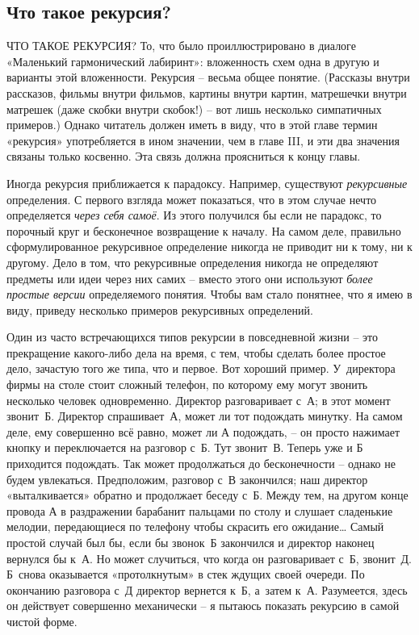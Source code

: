 \documentclass[../main.tex]{subfiles}
\begin{document}

\subsection{Что такое рекурсия?}

ЧТО ТАКОЕ РЕКУРСИЯ? То, что было проиллюстрировано в диалоге «Маленький гармонический лабиринт»: вложенность схем одна в другую и варианты этой вложенности. Рекурсия \--- весьма общее понятие. (Рассказы внутри рассказов, фильмы внутри фильмов, картины внутри картин, матрешечки внутри матрешек (даже скобки внутри скобок!) \--- вот лишь несколько симпатичных примеров.) Однако читатель должен иметь в виду, что в этой главе термин «рекурсия» употребляется в ином значении, чем в главе III, и эти два значения связаны только косвенно. Эта связь должна проясниться к концу главы.

Иногда рекурсия приближается к парадоксу. Например, существуют \emph{рекурсивные} определения. С первого взгляда может показаться, что в этом случае нечто определяется \emph{через себя самоё}. Из этого получился бы если не парадокс, то порочный круг и бесконечное возвращение к началу. На самом деле, правильно сформулированное рекурсивное определение никогда не приводит ни к тому, ни к другому. Дело в том, что рекурсивные определения никогда не определяют предметы или идеи через них самих \--- вместо этого они используют \emph{более простые версии} определяемого понятия. Чтобы вам стало понятнее, что я имею в виду, приведу несколько примеров рекурсивных определений.

Один из часто встречающихся типов рекурсии в повседневной жизни \--- это прекращение какого-либо дела на время, с тем, чтобы сделать более простое дело, зачастую того же типа, что и первое. Вот хороший пример. У~директора фирмы на столе стоит сложный телефон, по которому ему могут звонить несколько человек одновременно. Директор разговаривает с~А; в этот момент звонит~Б\@. Директор спрашивает~А, может ли тот подождать минутку. На самом деле, ему совершенно всё равно, может ли А подождать, \--- он просто нажимает кнопку и переключается на разговор с~Б\@. Тут звонит~В\@. Теперь уже и Б приходится подождать. Так может продолжаться до бесконечности \--- однако не будем увлекаться. Предположим, разговор с~В закончился; наш директор «выталкивается» обратно и продолжает беседу с~Б\@. Между тем, на другом конце провода А в раздражении барабанит пальцами по столу и слушает сладенькие мелодии, передающиеся по телефону чтобы скрасить его ожидание\ldots{} Самый простой случай был бы, если бы звонок~Б закончился и директор наконец вернулся бы к~А\@. Но может случиться, что когда он разговаривает с~Б, звонит~Д\@. Б~снова оказывается «протолкнутым» в стек ждущих своей очереди. По окончанию разговора с~Д директор вернется к~Б, а~затем к~А\@. Разумеется, здесь он действует совершенно механически \--- я пытаюсь показать рекурсию в самой чистой форме.
\end{document}
